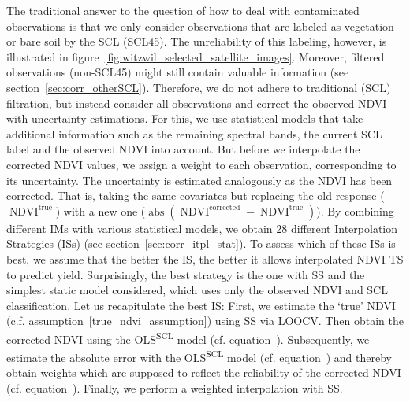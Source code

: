 The traditional answer to the question of how to deal with contaminated observations is that we only consider observations that are labeled as vegetation or bare soil by the SCL (SCL45). The unreliability of this labeling, however, is illustrated in figure~\ref{fig:witzwil_selected_satellite_images}. Moreover, filtered observations (non-SCL45) might still contain valuable information (see section~\ref{sec:corr_otherSCL}). Therefore, we do not adhere to traditional (SCL) filtration, but instead consider all observations and correct the observed NDVI with uncertainty estimations. For this, we use statistical models that take additional information such as the remaining spectral bands, the current SCL label and the observed NDVI into account. But before we interpolate the corrected NDVI values, we assign a weight to each observation, corresponding to its uncertainty. The uncertainty is estimated analogously as the NDVI has been corrected. That is, taking the same covariates but replacing the old response ($\operatorname{NDVI}^\text{true}$) with a new one ($\operatorname{abs}(\operatorname{NDVI}^\text{corrected}-\operatorname{NDVI}^\text{true})$).
    By combining different {{IM}}s with various statistical models, we obtain 28 different Interpolation Strategies ({{IS}}s) (see section~\ref{sec:corr_itpl_stat}). To assess which of these {{IS}}s is best, we assume that the better the {{IS}}, the better it allows interpolated NDVI {TS} to predict yield. Surprisingly, the best strategy is the one with SS and the simplest static model considered, which uses only the observed NDVI and SCL classification.
Let us recapitulate the best {{IS}}: First, we estimate the `true' NDVI (c.f. assumption~\ref{true_ndvi_assumption}) using SS via LOOCV. Then obtain the corrected NDVI using the OLS\textsuperscript{SCL} model (cf. equation~). Subsequently, we estimate the absolute error with the OLS\textsuperscript{SCL} model (cf. equation~) and thereby obtain weights which are supposed to reflect the reliability of the corrected NDVI (cf. equation~). Finally, we perform a weighted interpolation with SS.


